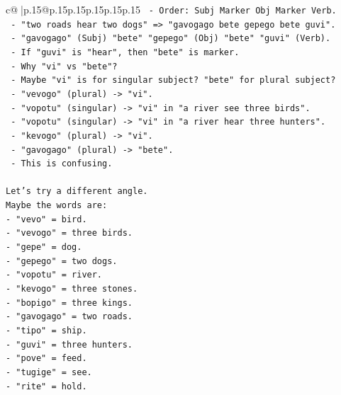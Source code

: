 \documentclass{article}
\begin{document}
{\begin{supertabular}{c@{$\;$}|p{.15\linewidth}@{}p{.15\linewidth}p{.15\linewidth}p{.15\linewidth}p{.15\linewidth}p{.15\linewidth}}
{{{\texttt{                    {-} Order: Subj Marker Obj Marker Verb.} \\
\texttt{                    {-} "two roads hear two dogs" => "gavogago bete gepego bete guvi".} \\
\texttt{                    {-} "gavogago" (Subj) "bete" "gepego" (Obj) "bete" "guvi" (Verb).} \\
\texttt{                    {-} If "guvi" is "hear", then "bete" is marker.} \\
\texttt{                    {-} Why "vi" vs "bete"?} \\
\texttt{                    {-} Maybe "vi" is for singular subject? "bete" for plural subject?} \\
\texttt{                    {-} "vevogo" (plural) {-}> "vi".} \\
\texttt{                    {-} "vopotu" (singular) {-}> "vi" in "a river see three birds".} \\
\texttt{                    {-} "vopotu" (singular) {-}> "vi" in "a river hear three hunters".} \\
\texttt{                    {-} "kevogo" (plural) {-}> "vi".} \\
\texttt{                    {-} "gavogago" (plural) {-}> "bete".} \\
\texttt{                    {-} This is confusing.} \\
\\ 
\texttt{Let's try a different angle.} \\
\texttt{Maybe the words are:} \\
\texttt{{-} "vevo" = bird.} \\
\texttt{{-} "vevogo" = three birds.} \\
\texttt{{-} "gepe" = dog.} \\
\texttt{{-} "gepego" = two dogs.} \\
\texttt{{-} "vopotu" = river.} \\
\texttt{{-} "kevogo" = three stones.} \\
\texttt{{-} "bopigo" = three kings.} \\
\texttt{{-} "gavogago" = two roads.} \\
\texttt{{-} "tipo" = ship.} \\
\texttt{{-} "guvi" = three hunters.} \\
\texttt{{-} "pove" = feed.} \\
\texttt{{-} "tugige" = see.} \\
\texttt{{-} "rite" = hold.} \\
}}}
\end{supertabular}}
\end{document}
